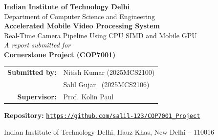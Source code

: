\documentclass[12pt,a4paper]{article}
\begin{document}
\begin{titlepage}
    \thispagestyle{empty}
    \centering
    \vspace*{1.5cm}

    {\LARGE \textbf{Indian Institute of Technology Delhi}}\\[0.4em]
    {\large Department of Computer Science and Engineering}\\[2.5cm]

    {\huge \textbf{Accelerated Mobile Video Processing System}}\\[0.6em]
    {\Large Real-Time Camera Pipeline Using CPU SIMD and Mobile GPU}\\[2.5cm]

    {\large \textit{A report submitted for}}\\[0.4em]
    {\large \textbf{Cornerstone Project (COP7001)}}\\[2cm]

    \begin{tabular}{rl}
        \textbf{Submitted by:} & Nitish Kumar \quad (2025MCS2100) \\[0.3em]
                               & Salil Gujar \quad\, (2025MCS2106) \\[1.2em]
        \textbf{Supervisor:}   & Prof.\ Kolin Paul \\[1.2em]
        
    \end{tabular}

    {\small \textbf{Repository:} \href{https://github.com/salil-123/COP7001_Project}{\texttt{https://github.com/salil-123/COP7001\_Project}}}

    \vfill

    {\small Indian Institute of Technology Delhi, Hauz Khas, New Delhi -- 110016}
\end{titlepage}
\end{document}
